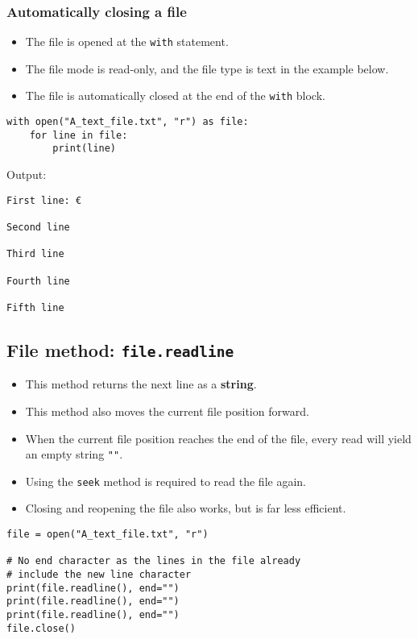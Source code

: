 \documentclass[11pt]{article}
\begin{document}
\subsubsection{Automatically closing a file}
\label{sec:orga670e5e}
\begin{itemize}
\item The file is opened at the \texttt{with} statement.
\item The file mode is read-only, and the file type is text in the example below.
\item The file is automatically closed at the end of the \texttt{with} block.
\end{itemize}

\begin{verbatim}
with open("A_text_file.txt", "r") as file:
    for line in file:
        print(line)
\end{verbatim}

 \noindent Output:

\label{org8bcfe50}
\begin{verbatim}
First line: €

Second line

Third line

Fourth line

Fifth line

\end{verbatim}
\subsection{File method: \texttt{file.readline}}
\label{sec:org592d55f}
\begin{itemize}
\item This method returns the next line as a \textbf{string}.
\item This method also moves the current file position forward.
\item When the current file position reaches the end of the file, every read will yield an empty string \texttt{""}.
\item Using the \texttt{seek} method is required to read the file again.
\item Closing and reopening the file also works, but is far less efficient.
\end{itemize}

\begin{verbatim}
file = open("A_text_file.txt", "r")

# No end character as the lines in the file already
# include the new line character
print(file.readline(), end="")
print(file.readline(), end="")
print(file.readline(), end="")
file.close()
\end{verbatim}
\end{document}
